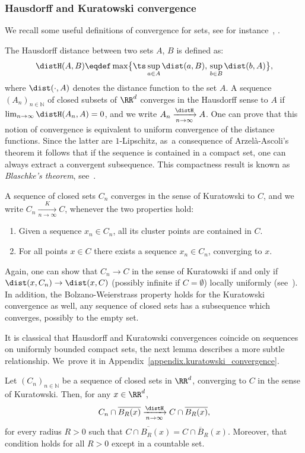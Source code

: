 
\subsubsection{Hausdorff and Kuratowski convergence}\label{subsection.Hausdorff_Kuratoski}
We recall some useful definitions of convergence for sets, see for instance~\cite[Chap.\,4]{rockafellar2009variational}, \cite[Chap.\,6]{ambrosio2000functions}.

The Hausdorff distance between two sets $A$, $B$ is defined
as:
\begin{equation}
\label{hausdorff.distance}
\distH(A,B) \eqdef \max\bigl\{\ts
\sup_{a \in A} \dist(a, B),\, \sup_{b \in B} \dist(b, A)
\bigr\},
\end{equation}
where $\dist(\cdot, A)$ denotes the distance function to the set $A$.
A sequence $\left(A_n\right)_{n \in \mathbb{N}}$ of closed subsets of $\RR^d$ converges in the Hausdorff sense to $A$ if $\lim_{n\to\infty} \distH(A_n, A)=0$, and we write $A_n \xrightarrow[n \to \infty]{\distH} A$.
One can prove that this notion of convergence is equivalent to uniform convergence of the distance functions. Since the latter are $1$-Lipschitz, as~a consequence of Arzelà-Ascoli's theorem it follows that if the sequence is contained in a compact set, one can always extract a convergent subsequence. This compactness result is known as \emph{Blaschke's theorem}, see~\cite[Th.\,6.1]{ambrosio2000functions}.

A sequence of closed sets $C_n$ converges in the sense of Kuratowski to $C$, and we write $C_n \xrightarrow[n \to \infty]{K} C$, whenever the two properties hold:
\begin{enumerate}
\item Given a sequence $x_n \in C_n$, all its cluster points are contained in $C$.
\item For all points $x\in C$ there exists a sequence $x_n \in C_n$, converging to $x$.
\end{enumerate}
Again, one can show that $C_n\to C$ in the sense of Kuratowski
if and only if $\dist(x,C_n)\to\dist(x,C)$ (possibly infinite if $C=\emptyset$) locally uniformly (see~\cite[Cor.\,4.7]{rockafellar2009variational}). In addition, the Bolzano-Weierstrass property holds for the Kuratowski convergence as well, \ie any sequence of closed sets has a subsequence which converges, possibly to the empty set.

It is classical that Hausdorff and Kuratowski convergences coincide on sequences on uniformly bounded compact sets, the next lemma describes a more subtle relationship. We~prove it in Appendix~\ref{appendix.kuratowski_convergence}.
\begin{lemma}\label{lemma.localized_Kuratowski}
Let $(C_n)_{n \in \mathbb{N}}$ be a sequence of closed sets in $\RR^d$, converging to $C$ in the sense of Kuratowski.
Then, for any $x \in \RR^d$,
\[
C_n\cap\overline{B_R(x)}
\xrightarrow[n \to \infty]{\distH}
C\cap\overline{B_R(x)},
\]
for every radius $R>0$ such that $\overline{C\cap B_R(x)} = C\cap \overline{B}_R(x)$. Moreover, that condition holds for all $R>0$ except in a countable set.
\end{lemma}

